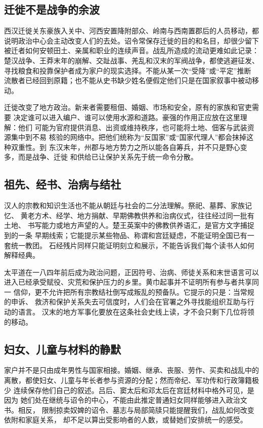 \subsection{迁徙不是战争的余波}

西汉迁徙关东豪族入关中、河西安置降附部众、岭南与西南置郡后的人员移动，都
说明政治中心会主动改变人们的去处。诏令常保存迁徙的目的和名目，却很少留下
被迁者如何安顿田土、亲属和职业的连续声音。战乱所造成的流动更难如此记录：
楚汉战争、王莽末年的崩解、交趾战事、羌乱和汉末的军阀战争，都使逃避征发、
寻找粮食和投靠保护者成为家户的现实选择。不能从某一次“受降”或“平定”推断
流散者已经回到原籍；也不能从史书缺少姓名便假定他们只是在国家叙事中被动移动。

迁徙改变了地方政治。新来者需要租佃、婚姻、市场和安全，原有的家族和官吏需要
决定谁可以进入编户、谁可以使用水源和道路。豪强的作用正应放在这里理解：他们
可能为官府提供消息、出资或维持秩序，也可能将土地、佃客与武装资源集中到不易
核验的网络中。把他们统称为“反国家”或“国家代理人”都会抹掉这种双重性。到
东汉末年，州郡与地方势力之所以能各自筹兵，并不只是野心变多，而是战争、迁徙
和供给已让保护关系先于统一命令分散。

\subsection{祖先、经书、治病与结社}

汉人的宗教和知识生活也不能从朝廷与社会的二分法理解。祭祀、墓葬、家族记忆、
黄老方术、经学、地方捐献、早期佛教供养和治病仪式，往往经过同一批有土地、
书写能力或地方声望的人。楚王英案中的佛教供养语汇，是官方文字捕捉到的一条
早期线索；它能提示某些物品、称谓和宫廷疑虑，不能证明全国已有一套统一教团。
石经残片同样只能证明刻立和展示，不能告诉我们每个读书人如何解释经典。

太平道在一八四年前后成为政治问题，正因符号、治病、师徒关系和末世语言可以
进入已经承受赋役、灾荒和保护压力的乡里。黄巾起事并不证明所有参与者共享同一
信仰，更不允许把所有宗教结社倒写成叛乱的预备队。它提示的只是：当常规的申诉、
救济和保护关系失去可信度时，人们会在官署之外寻找能组织互助与行动的语言。
汉末的地方军事化要放在这条社会史线上读，才不会只剩下几位将领的移动。

\subsection{妇女、儿童与材料的静默}

家户并不是只由成年男性与国家相接。婚姻、继承、丧服、劳作、买卖和战乱中的
离散，都使妇女、儿童与年长者参与资源的分配；然而帝纪、军功传和行政簿籍极少
连续保存他们自己的叙述。吕后、窦太后和邓太后在宫廷材料中格外可见，是因为
她们处在继统与诏令的中心，不能由此推定普通妇女同样能够进入政治文书。相反，
限制掠卖奴婢的诏令、墓志与局部简牍只能提醒我们，战乱如何改变依附和家庭关系，
却不足以算出受影响者的人数，或替她们安排统一的感受。

